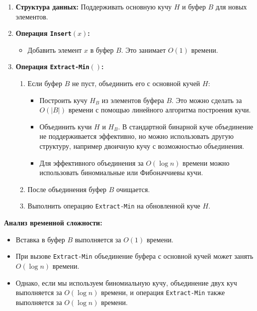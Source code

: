 \documentclass[11pt]{article}
\begin{document}
\begin{solution}
    \begin{enumerate}
        \item \textbf{Структура данных:} Поддерживать основную кучу $H$ и буфер $B$ для новых элементов.
        \item \textbf{Операция \texttt{Insert}$(x)$:}
              \begin{itemize}
                  \item Добавить элемент $x$ в буфер $B$. Это занимает $O(1)$ времени.
              \end{itemize}
        \item \textbf{Операция \texttt{Extract-Min}$()$:}
              \begin{enumerate}
                  \item Если буфер $B$ не пуст, объединить его с основной кучей $H$:
                        \begin{itemize}
                            \item Построить кучу $H_B$ из элементов буфера $B$. Это можно сделать за $O(|B|)$ времени с помощью линейного алгоритма построения кучи.
                            \item Объединить кучи $H$ и $H_B$. В стандартной бинарной куче объединение не поддерживается эффективно, но можно использовать другую структуру, например двоичную кучу с возможностью объединения.
                            \item Для эффективного объединения за $O(\log n)$ времени можно использовать биномиальные или Фибоначчиевы кучи.
                        \end{itemize}
                  \item После объединения буфер $B$ очищается.
                  \item Выполнить операцию \texttt{Extract-Min} на обновленной куче $H$.
              \end{enumerate}
    \end{enumerate}

    \textbf{Анализ временной сложности:}

    \begin{itemize}
        \item Вставка в буфер $B$ выполняется за $O(1)$ времени.
        \item При вызове \texttt{Extract-Min} объединение буфера с основной кучей может занять $O(\log n)$ времени.
        \item Однако, если мы используем биномиальную кучу, объединение двух куч выполняется за $O(\log n)$ времени, и операция \texttt{Extract-Min} также выполняется за $O(\log n)$ времени.
    \end{itemize}

\end{solution}
\end{document}
